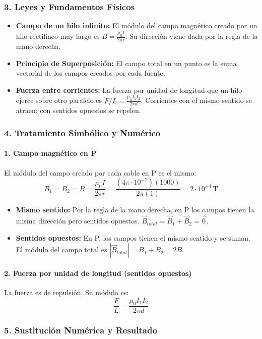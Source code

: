 \subsubsection*{3. Leyes y Fundamentos Físicos}
\begin{itemize}
    \item \textbf{Campo de un hilo infinito:} El módulo del campo magnético creado por un hilo rectilíneo muy largo es $B = \frac{\mu_0 I}{2\pi r}$. Su dirección viene dada por la regla de la mano derecha.
    \item \textbf{Principio de Superposición:} El campo total en un punto es la suma vectorial de los campos creados por cada fuente.
    \item \textbf{Fuerza entre corrientes:} La fuerza por unidad de longitud que un hilo ejerce sobre otro paralelo es $F/L = \frac{\mu_0 I_1 I_2}{2\pi d}$. Corrientes con el mismo sentido se atraen; con sentidos opuestos se repelen.
\end{itemize}

\subsubsection*{4. Tratamiento Simbólico y Numérico}
\paragraph{1. Campo magnético en P}
El módulo del campo creado por cada cable en P es el mismo:
$$ B_1 = B_2 = B = \frac{\mu_0 I}{2\pi r} = \frac{(4\pi\cdot 10^{-7})(1000)}{2\pi(1)} = 2 \cdot 10^{-4}\,\text{T} $$
\begin{itemize}
    \item \textbf{Mismo sentido:} Por la regla de la mano derecha, en P los campos tienen la misma dirección pero sentidos opuestos. $\vec{B}_{total} = \vec{B}_1 + \vec{B}_2 = \vec{0}$.
    \item \textbf{Sentidos opuestos:} En P, los campos tienen el mismo sentido y se suman. El módulo del campo total es $|\vec{B}_{total}| = B_1+B_2 = 2B$.
\end{itemize}
\paragraph{2. Fuerza por unidad de longitud (sentidos opuestos)}
La fuerza es de repulsión. Su módulo es:
$$ \frac{F}{L} = \frac{\mu_0 I_1 I_2}{2\pi d} $$

\subsubsection*{5. Sustitución Numérica y Resultado}
